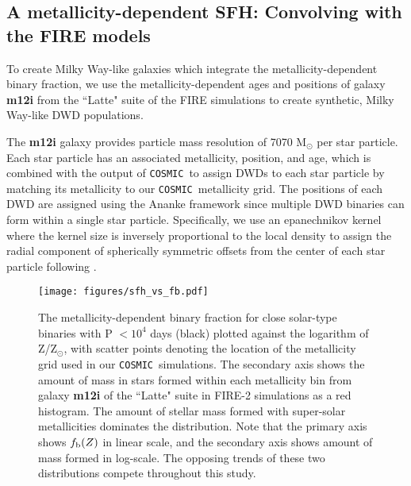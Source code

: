\documentclass[twocolumn]{aastex631}
\newcommand{\cosmic}{\texttt{COSMIC}}
\begin{document}
\subsection{A metallicity-dependent SFH: Convolving with the FIRE models}
\label{sec:FIRE}
To create Milky Way-like galaxies which integrate the metallicity-dependent binary fraction, we use the metallicity-dependent ages and positions of galaxy \textbf{m12i} from the ``Latte" suite of the FIRE simulations \citep{Hopkins2015, Wetzel2016, Hopkins2018} to create synthetic, Milky Way-like DWD populations. %

The \textbf{m12i} galaxy provides particle mass resolution of 7070 M$_\odot$ per star particle. Each star particle has an associated metallicity, position, and age, which is combined with the output of \cosmic\ to assign DWDs to each star particle by matching its metallicity to our \cosmic\ metallicity grid. The positions of each DWD are assigned using the Ananke framework since multiple DWD binaries can form within a single star particle. Specifically, we use an epanechnikov kernel where the kernel size is inversely proportional to the local density to assign the radial component of spherically symmetric offsets from the center of each star particle following \citet{Sanderson2020}. 

\begin{figure}
	\texttt{[image: figures/sfh\_vs\_fb.pdf]}
    \caption{The metallicity-dependent binary fraction for close solar-type binaries with P $< 10^4$ days (black) plotted against the logarithm of Z/Z$_\odot$, with scatter points denoting the location of the metallicity grid used in our \cosmic\ simulations. The secondary axis shows the amount of mass in stars formed within each metallicity bin from galaxy \textbf{m12i} of the ``Latte" suite in FIRE-2 simulations as a red histogram. The amount of stellar mass formed with super-solar metallicities dominates the distribution. Note that the primary axis shows $f_{\rm{b}}(Z)$ in linear scale, and the secondary axis shows amount of mass formed in log-scale. The opposing trends of these two distributions compete throughout this study.}
    \label{fig:sfh_vs_fb}
\end{figure}
\end{document}
